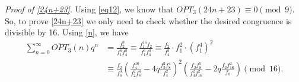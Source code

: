 \documentclass[12pt,reqno]{amsart}
\numberwithin{equation}{section}
\newcommand{\opt}{\overline{OPT}}
\begin{document}

\emph{Proof of \eqref{24n+23}}. Using \eqref{eq12}, we know that $\opt_3(24n+23)\equiv 0\pmod9$. So, to prove \eqref{24n+23} we only need to check whether the desired congruence is divisible by 16. Using \eqref{n}, we have
\begin{align*}
    \sum_{n=0}^{\infty}\opt_3(n)q^n &= \frac{f_{2}^9}{f_{1}^6f_{4}^3}\equiv \frac{f_{1}^{16}f_{2}}{f_{1}^6f_{4}^3}\equiv \frac{f_{2}}{f_{4}^3} \cdot f_{1}^2 \cdot \left(f_{1}^4\right)^2\\
    &\equiv \frac{f_{2}}{f_{4}^3}  \left(\frac{f_{4}^{10}}{f_{2}^2f_{8}^4} - 4 q \frac{f_{2}^2 f_{8}^4}{f_{4}^2}\right)^2 \left(\frac{f_{2}f_{8}^5}{f_{4}^2f_{16}^2} - 2 q \frac{f_{2} f_{16}^2 }{f_{8}}\right) \pmod{16}.
\end{align*}
\end{document}
